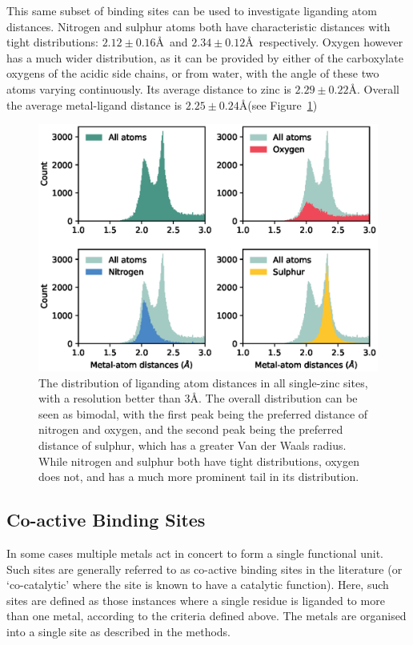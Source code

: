 This same subset of binding sites can be used to investigate liganding atom distances. Nitrogen and sulphur atoms both have characteristic distances with tight distributions: $2.12\pm0.16$\AA\ and $2.34\pm0.12$\AA\ respectively. Oxygen however has a much wider distribution, as it can be provided by either of the carboxylate oxygens of the acidic side chains, or from water, with the angle of these two atoms varying continuously. Its average distance to zinc is $2.29\pm0.22$\AA. Overall the average metal-ligand distance is $2.25\pm0.24$\AA (see Figure~\ref{fig:atom-distances})

\begin{figure}
\centering
\includegraphics[width=1.0\textwidth]{Figures/atom-distances.eps}
\caption[The distribution of liganding atom distances in all single-zinc sites.]{\label{fig:atom-distances} The distribution of liganding atom
  distances in all single-zinc sites, with a resolution better than
  3\AA. The overall distribution can be seen as bimodal, with the
  first peak being the preferred distance of nitrogen and oxygen, and
  the second peak being the preferred distance of sulphur, which has a
  greater Van der Waals radius.  While nitrogen and sulphur both have
  tight distributions, oxygen does not, and has a much more prominent
  tail in its distribution.}
\end{figure}

\subsection{Co-active Binding Sites}

In some cases multiple metals act in concert to form a single functional unit. Such sites are generally referred to as co-active binding sites in the literature (or `co-catalytic' where the site is known to have a catalytic function). Here, such sites are defined as those instances where a single residue is liganded to more than one metal, according to the criteria defined above. The metals are organised into a single site as described in the methods.

